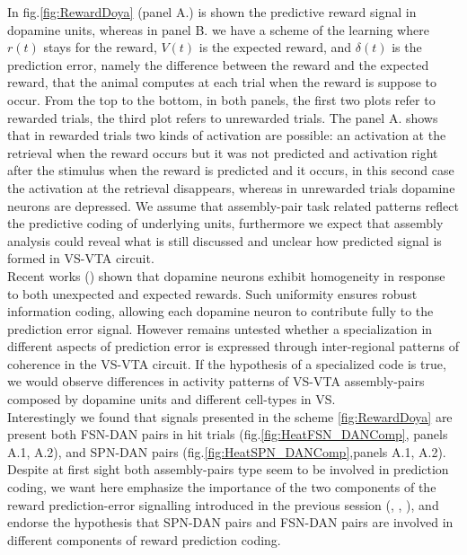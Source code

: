 In fig.\ref{fig:RewardDoya} (panel A.) is shown the predictive reward signal in dopamine units, whereas in panel B. we have a scheme of the learning where $r(t)$ stays for the reward, $V(t)$ is the expected reward, and $\delta(t)$ is the prediction error, namely the difference between the reward and the expected reward, that the animal computes at each trial when the reward is suppose to occur. From the top to the bottom, in both panels, the first two plots refer to rewarded trials, the third plot refers to unrewarded trials. The panel A. shows that in rewarded trials two kinds of activation are possible: an activation at the retrieval when the reward occurs but it was not predicted and activation right after the stimulus when the reward is predicted and it occurs, in this second case the activation at the retrieval disappears, whereas in unrewarded trials dopamine neurons are depressed. We assume that assembly-pair task related patterns reflect the predictive coding of underlying units, furthermore we expect that assembly analysis could reveal what is still discussed and unclear how predicted signal is formed in VS-VTA circuit.\\Recent works (\cite{UchidaDop}) shown that dopamine neurons exhibit homogeneity in response to both unexpected and expected rewards. Such uniformity ensures robust information coding, allowing each dopamine neuron to contribute fully to the prediction error signal. However remains untested whether a specialization in different aspects of prediction error is expressed through inter-regional patterns of coherence in the VS-VTA circuit. If the hypothesis of a specialized code is true, we would observe differences in activity patterns of VS-VTA assembly-pairs composed by dopamine units and different cell-types in VS.\\Interestingly we found that signals presented in the scheme \ref{fig:RewardDoya} are present both FSN-DAN pairs in hit trials (fig.\ref{fig:HeatFSN_DANComp}, panels A.1, A.2), and SPN-DAN pairs (fig.\ref{fig:HeatSPN_DANComp},panels A.1, A.2).\\Despite at first sight both assembly-pairs type seem to be involved in prediction coding, we want here emphasize the importance of the two components of the reward prediction-error signalling introduced in the previous session (\cite{Tobler2003}, \cite{Nomoto2010}, \cite{Fiorillo2013} \cite{Schultz2016}), and endorse the hypothesis that SPN-DAN pairs and FSN-DAN pairs are involved in different components of reward prediction coding.\\
